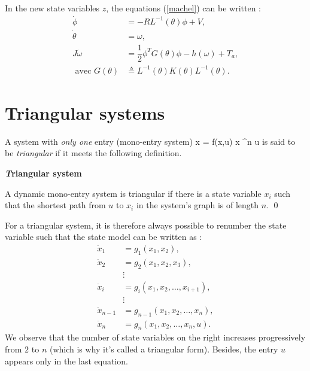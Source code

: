 In the new state variables $z$, the equations (\ref{machel}) can be written : 
\begin{equation*} \begin{split}
\dot\phi &= -RL^{-1}(\theta)\phi+ V,\\
\dot \theta &= \omega,\\
J\dot\omega &= \dfrac{1}{2} \phi^T G(\theta) \phi - h(\omega) + T_a,\\
\mbox{ avec } G(\theta) &\triangleq  L^{-1}(\theta)K(\theta)L^{-1}(\theta).
\end{split} \end{equation*}
\vv

\section{Triangular systems} \label{triangulaire}
 
 A system with {\it only one} entry (mono-entry system)
 \eqn
 \dot x = f(x,u) \hh \hh x \in \real^n \hh \hh u \in \real \label{mono}
 \eeqn
is said to be {\it triangular} if it meets the following definition.

\begin{definition}{\bf \emph Triangular system}

A dynamic mono-entry system is triangular if there is a state variable $x_i$ such that the shortest path from $u$ to $x_i$ in the system's graph is of length $n$. \qed
\end{definition}

For a triangular system, it is therefore always possible to renumber the state variable such that the state model can be written as :
\begin{equation} \begin{split} \label{systriang}
\dot x_1 &= g_1(x_1,x_2),  \\
\dot x_2 &= g_2(x_1,x_2, x_3),  \\
&\vdots  \\
\dot x_i &= g_i(x_1,x_2, \dots ,x_{i+1}),  \\
&\vdots  \\
\dot x_{n-1} &= g_{n-1}(x_1,x_2, \dots ,x_n),  \\
\dot x_n &= g_n(x_1,x_2, \dots ,x_n,u).  
\end{split} \end{equation}
We observe that the number of state variables on the right increases progressively from $2$ to $n$ (which is why it's called a triangular form). Besides, the entry $u$ appears only in the last equation.
\vv

